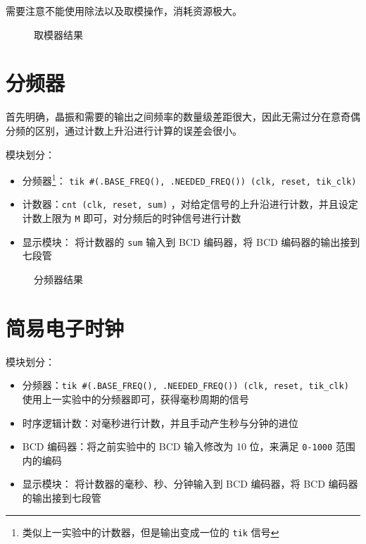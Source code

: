 \documentclass[lang=cn,11pt,a4paper,cite=authoryear]{elegantpaper}
\begin{document}
需要注意不能使用除法以及取模操作，消耗资源极大。



\begin{figure}
    \centering
    \caption{取模器结果}\label{02} 
     \hfill 
     \hfill 
     \hfill 
     \hfill 
     \hfill 
\end{figure}

\section{分频器}

首先明确，晶振和需要的输出之间频率的数量级差距很大，因此无需过分在意奇偶分频的区别，通过计数上升沿进行计算的误差会很小。

模块划分：

\begin{itemize}
    \item 分频器\footnote{类似上一实验中的计数器，但是输出变成一位的 \lstinline{tik} 信号}： \lstinline{tik #(.BASE_FREQ(), .NEEDED_FREQ()) (clk, reset, tik_clk)} 
    \item 计数器：\lstinline{cnt (clk, reset, sum)} ，对给定信号的上升沿进行计数，并且设定计数上限为 \lstinline{M} 即可，对分频后的时钟信号进行计数
    \item 显示模块： 将计数器的 \lstinline{sum} 输入到 BCD 编码器，将 BCD 编码器的输出接到七段管
\end{itemize}


\begin{figure}
    \centering
    \caption{分频器结果}\label{03} 
     \hfill 
     \hfill
     \hfill 
     \bigskip 
\end{figure}

\section{简易电子时钟}


模块划分：

\begin{itemize}
    \item 分频器：\lstinline{tik #(.BASE_FREQ(), .NEEDED_FREQ()) (clk, reset, tik_clk)}  使用上一实验中的分频器即可，获得毫秒周期的信号
    \item 时序逻辑计数：对毫秒进行计数，并且手动产生秒与分钟的进位
    \item BCD 编码器：将之前实验中的 BCD 输入修改为 10 位，来满足 \lstinline{0-1000} 范围内的编码
    \item 显示模块： 将计数器的毫秒、秒、分钟输入到 BCD 编码器，将 BCD 编码器的输出接到七段管
\end{itemize}
\end{document}
